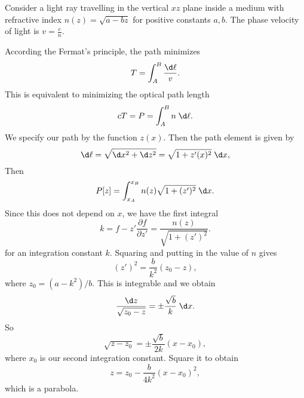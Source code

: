 \documentclass[a4paper]{article}
\begin{document}
\begin{eg}
  Consider a light ray travelling in the vertical $xz$ plane inside a medium with refractive index $n(z) = \sqrt{a - bz}$ for positive constants $a, b$. The phase velocity of light is $v = \frac{c}{n}$.

  According the Fermat's principle, the path minimizes
  \[
    T = \int_A^B \frac{\d \ell}{v}.
  \]
  This is equivalent to minimizing the optical path length
  \[
    cT = P = \int_A^B n\;\d \ell.
  \]
  We specify our path by the function $z(x)$. Then the path element is given by
  \[
    \d \ell = \sqrt{\d x^2 + \d z^2} = \sqrt{1 + z'(x)^2}\;\d x,
  \]
  Then
  \[
    P[z] = \int_{x_A}^{x_B}n(z)\sqrt{1 + (z')^2}\;\d x.
  \]
  Since this does not depend on $x$, we have the first integral
  \[
    k = f - z'\frac{\partial f}{\partial z'} = \frac{n(z)}{\sqrt{1 + (z')^2}}.
  \]
  for an integration constant $k$. Squaring and putting in the value of $n$ gives
  \[
    (z')^2 = \frac{b}{k^2}(z_0 - z),
  \]
  where $z_0 = (a - k^2)/b$. This is integrable and we obtain
  \[
    \frac{\d z}{\sqrt{z_0 - z}} = \pm\frac{\sqrt{b}}{k}\;\d x.
  \]
  So
  \[
    \sqrt{z - z_0} = \pm \frac{\sqrt{b}}{2k}(x - x_0),
  \]
  where $x_0$ is our second integration constant. Square it to obtain
  \[
    z = z_0 - \frac{b}{4k^2}(x - x_0)^2,
  \]
  which is a parabola.
\end{eg}
\end{document}
